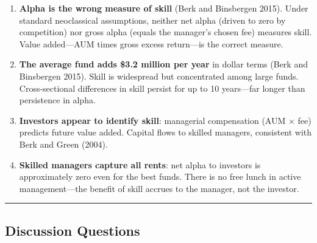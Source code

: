 \documentclass[
  letterpaper,
  DIV=11,
  numbers=noendperiod]{scrartcl}
\begin{document}
\begin{enumerate}
  monthly data would be insufficient. This generalizes well beyond fund
  performance.
\item
  \textbf{Alpha is the wrong measure of skill} (Berk and Binsbergen
  2015). Under standard neoclassical assumptions, neither net alpha
  (driven to zero by competition) nor gross alpha (equals the manager's
  chosen fee) measures skill. Value added---AUM times gross excess
  return---is the correct measure.
\item
  \textbf{The average fund adds \$3.2 million per year} in dollar terms
  (Berk and Binsbergen 2015). Skill is widespread but concentrated among
  large funds. Cross-sectional differences in skill persist for up to 10
  years---far longer than persistence in alpha.
\item
  \textbf{Investors appear to identify skill}: managerial compensation
  (AUM × fee) predicts future value added. Capital flows to skilled
  managers, consistent with Berk and Green (2004).
\item
  \textbf{Skilled managers capture all rents}: net alpha to investors is
  approximately zero even for the best funds. There is no free lunch in
  active management---the benefit of skill accrues to the manager, not
  the investor.
\end{enumerate}

\begin{center}\rule{0.5\linewidth}{0.5pt}\end{center}

\subsection{Discussion Questions}\label{discussion-questions}
\end{document}
